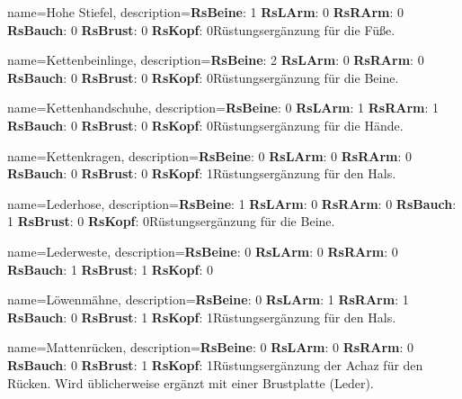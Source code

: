 {
    name={Hohe Stiefel},
    description={\textbf{RsBeine}: 1 \textbf{RsLArm}: 0 \textbf{RsRArm}: 0 \textbf{RsBauch}: 0 \textbf{RsBrust}: 0 \textbf{RsKopf}: 0\newline Rüstungsergänzung für die Füße.}
}


{
    name={Kettenbeinlinge},
    description={\textbf{RsBeine}: 2 \textbf{RsLArm}: 0 \textbf{RsRArm}: 0 \textbf{RsBauch}: 0 \textbf{RsBrust}: 0 \textbf{RsKopf}: 0\newline Rüstungsergänzung für die Beine.}
}


{
    name={Kettenhandschuhe},
    description={\textbf{RsBeine}: 0 \textbf{RsLArm}: 1 \textbf{RsRArm}: 1 \textbf{RsBauch}: 0 \textbf{RsBrust}: 0 \textbf{RsKopf}: 0\newline Rüstungsergänzung für die Hände.}
}


{
    name={Kettenkragen},
    description={\textbf{RsBeine}: 0 \textbf{RsLArm}: 0 \textbf{RsRArm}: 0 \textbf{RsBauch}: 0 \textbf{RsBrust}: 0 \textbf{RsKopf}: 1\newline Rüstungsergänzung für den Hals.}
}


{
    name={Lederhose},
    description={\textbf{RsBeine}: 1 \textbf{RsLArm}: 0 \textbf{RsRArm}: 0 \textbf{RsBauch}: 1 \textbf{RsBrust}: 0 \textbf{RsKopf}: 0\newline Rüstungsergänzung für die Beine.}
}


{
    name={Lederweste},
    description={\textbf{RsBeine}: 0 \textbf{RsLArm}: 0 \textbf{RsRArm}: 0 \textbf{RsBauch}: 1 \textbf{RsBrust}: 1 \textbf{RsKopf}: 0\newline }
}


{
    name={Löwenmähne},
    description={\textbf{RsBeine}: 0 \textbf{RsLArm}: 1 \textbf{RsRArm}: 1 \textbf{RsBauch}: 0 \textbf{RsBrust}: 1 \textbf{RsKopf}: 1\newline Rüstungsergänzung für den Hals.}
}


{
    name={Mattenrücken},
    description={\textbf{RsBeine}: 0 \textbf{RsLArm}: 0 \textbf{RsRArm}: 0 \textbf{RsBauch}: 0 \textbf{RsBrust}: 1 \textbf{RsKopf}: 1\newline Rüstungsergänzung der Achaz für den Rücken. Wird üblicherweise ergänzt mit einer Brustplatte (Leder).}
}


